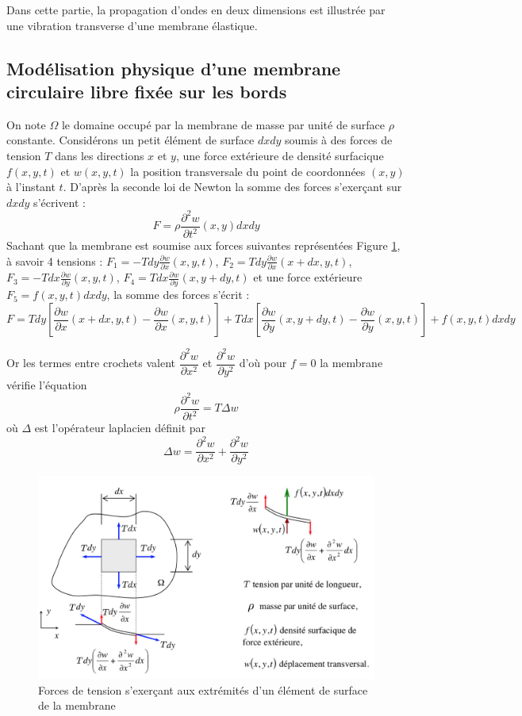 \documentclass[a4,12pt]{article}
\begin{document}
Dans cette partie, la propagation d'ondes en deux dimensions est illustrée par une vibration transverse d'une membrane élastique.

\subsection{Modélisation physique d'une membrane circulaire libre fixée sur les bords}

On note $\Omega$ le domaine occupé par la membrane de masse par unité de surface $\rho$ constante. Considérons un petit élément de surface $dxdy$ soumis à des forces de tension $T$  dans les directions $x$ et $y$, une force extérieure de densité surfacique $f(x,y,t)$ et $w(x,y,t)$ la position transversale du point de coordonnées $(x,y)$ à l'instant $t$. D'après la seconde loi de Newton la somme des forces s'exerçant sur $dxdy$ s'écrivent : 
\[
F=\rho  \frac{\partial^2 w}{\partial t^2}(x,y)dxdy
\]
Sachant que la membrane est soumise aux forces suivantes représentées Figure \ref{fig:membrane}, à savoir 4 tensions : $F_1=-Tdy\frac{\partial w}{\partial x}(x,y,t)$, $F_2=Tdy\frac{\partial w}{\partial x}(x+dx,y,t)$, $F_3=-Tdx\frac{\partial w}{\partial y}(x,y,t)$, $F_4=Tdx\frac{\partial w}{\partial y}(x,y+dy,t)$ et une force extérieure $F_5=f(x,y,t)dxdy$, la somme des forces s'écrit : 
\[
F=Tdy\left[\frac{\partial w}{\partial x}(x+dx,y,t)-\frac{\partial w}{\partial x}(x,y,t)\right]+Tdx\left[\frac{\partial w}{\partial y}(x,y+dy,t)-\frac{\partial w}{\partial y}(x,y,t)\right]+f(x,y,t)dxdy
\]

Or les termes entre crochets valent $\dfrac{\partial^2 w}{\partial x^2}$ et $\dfrac{\partial^2 w}{\partial y^2}$ d'où pour $f=0$ la membrane vérifie l'équation 
\[
\rho \dfrac{\partial^2 w}{\partial t^2}=T \Delta w
\]
où $\Delta$ est l'opérateur laplacien définit par 
\[
\Delta w=\dfrac{\partial^2 w}{\partial x^2}+\dfrac{\partial^2 w}{\partial y^2}
\]

\begin{figure}
	\begin{center}
		\includegraphics[width=\textwidth]{images/membrane-equation.pdf}
		\caption{Forces de tension s'exerçant aux extrémités d'un élément de surface de la membrane}
		\label{fig:membrane}
	\end{center}
\end{figure}
\end{document}
